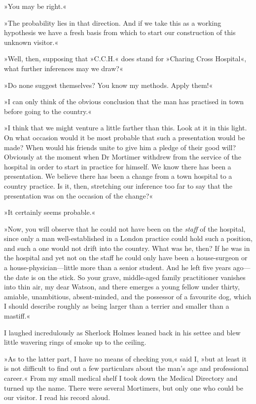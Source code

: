»You may be right.«

»The probability lies in that direction. And if we take this as a working hypothesis we have a fresh basis from which to start our construction of this unknown visitor.«

»Well, then, supposing that »C.C.H.« does stand for »Charing Cross Hospital«, what further inferences may we draw?«

»Do none suggest themselves? You know my methods. Apply them!«

»I can only think of the obvious conclusion that the man has practised in town before going to the country.«

»I think that we might venture a little farther than this. Look at it in this light. On what occasion would it be most probable that such a presentation would be made? When would his friends unite to give him a pledge of their good will? Obviously at the moment when Dr Mortimer withdrew from the service of the hospital in order to start in practice for himself. We know there has been a presentation. We believe there has been a change from a town hospital to a country practice. Is it, then, stretching our inference too far to say that the presentation was on the occasion of the change?«

»It certainly seems probable.«

»Now, you will observe that he could not have been on the \emph{staff} of the hospital, since only a man well-established in a London practice could hold such a position, and such a one would not drift into the country. What was he, then? If he was in the hospital and yet not on the staff he could only have been a house-surgeon or a house-physician—little more than a senior student. And he left five years ago—the date is on the stick. So your grave, middle-aged family practitioner vanishes into thin air, my dear Watson, and there emerges a young fellow under thirty, amiable, unambitious, absent-minded, and the possessor of a favourite dog, which I should describe roughly as being larger than a terrier and smaller than a mastiff.«

I laughed incredulously as Sherlock Holmes leaned back in his settee and blew little wavering rings of smoke up to the ceiling.

»As to the latter part, I have no means of checking you,« said I, »but at least it is not difficult to find out a few particulars about the man's age and professional career.« From my small medical shelf I took down the Medical Directory and turned up the name. There were several Mortimers, but only one who could be our visitor. I read his record aloud.

